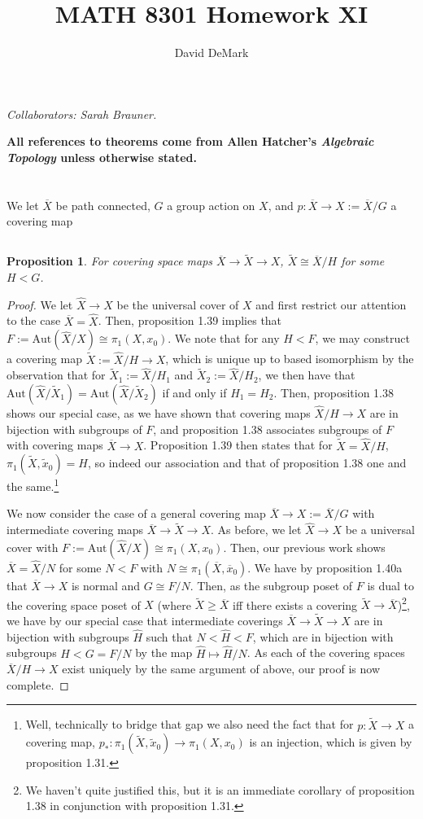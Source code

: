 \documentclass[english]{article}
\title{MATH 8301 Homework XI}
\author{David DeMark}
\date{\due}
\newcommand{\prob}[1]{\setcounter{section}{#1-1}\section{}}
\newcommand{\prt}[1]{\setcounter{subsection}{#1-1}\subsection{}}
\newtheorem*{proposition*}{Proposition}
\theoremstyle{remark}
\theoremstyle{definition}
\newcommand{\oX}{\overline{X}}
\newcommand{\ox}{\overline{x}}
\newcommand{\tX}{\tilde{X}}
\newcommand{\tx}{\tilde{x}}
\newcommand{\hX}{\hat{X}}
\newcommand{\aut}{\mathrm{Aut}}
\begin{document}
\maketitle
\emph{Collaborators: Sarah Brauner.}

\noindent\textbf{All references to theorems come from Allen Hatcher's \emph{Algebraic Topology} unless otherwise stated.}
\prob{1}
We let $\oX$ be path connected, $G$ a group action on $X$, and $p:\oX\to X:=\oX/G$ a covering map
\prt{1}
\begin{proposition*}
	For covering space maps $\oX\to \tX\to X$, $\tX\cong \oX/H$ for some $H<G$. 
\end{proposition*}
\begin{proof}
	We let $\hX\to X$ be the universal cover of $X$ and first restrict our attention to the case $\oX=\hX$. Then, proposition 1.39 implies that $F:=\aut(\hX/X)\cong \pi_1(X,x_0)$. We note that for any $H<F$, we may construct a covering map $\tX:=\hX/H\to X$, which is unique up to based isomorphism by the observation that for $\tX_1:=\hX/H_1$ and $\tX_2:=\hX/H_2$, we then have that $\aut(\hX/\tX_1)=\aut(\hX/\tX_2)$ if and only if $H_1=H_2$. Then, proposition 1.38 shows our special case, as we have shown that covering maps $\hX/H\to X$ are in bijection with subgroups of $F$, and proposition 1.38 associates subgroups of $F$ with covering maps $\oX\to X$. Proposition 1.39 then states that for $\tX=\hX/H$, $\pi_1(\tX,\tx_0)=H$, so indeed our association and that of proposition 1.38 one and the same.\footnote{Well, technically to bridge that gap we also need the fact that for $p:\tX\to X$ a covering map, $p_*:\pi_1(\tX,\tx_0)\to \pi_1(X,x_0)$ is an injection, which is given by proposition 1.31.} 
	
	We now consider the case of a general covering map $\oX\to X:=\oX/G$ with intermediate covering maps $\oX\to\tX\to X$. As before, we let $\hX\to X$ be a universal cover with $F:=\aut(\hX/X)\cong \pi_1(X,x_0)$. Then, our previous work shows $\oX=\hX/N$ for some $N<F$ with $N\cong \pi_1(\oX,\ox_0)$. We have by proposition 1.40a that $\oX\to X$ is normal and $G\cong F/N$. Then, as the subgroup poset of $F$ is dual to the covering space poset of $X$ (where $\tX\geq\oX$ iff there exists a covering $\tX\to \oX$)\footnote{We haven't quite justified this, but it is an immediate corollary of proposition 1.38 in conjunction with proposition 1.31.}, we have by our special case that intermediate coverings $\oX\to\tX\to X$ are in bijection with subgroups $\hat{H}$ such that $N<\hat{H}<F$, which are in bijection with subgroups $H<G=F/N$ by the map $\hat{H}\mapsto \hat{H}/N$. As each of the covering spaces $\oX/H\to X$ exist uniquely by the same argument of above, our proof is now complete. 
\end{proof}
\end{document}
